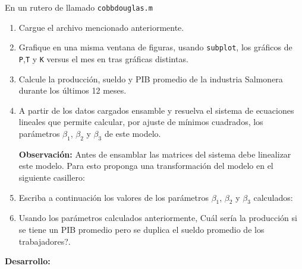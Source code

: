 En un rutero de \matlab llamado \texttt{cobbdouglas.m}
\begin{enumerate}
\item Cargue el archivo mencionado anteriormente.
\item Grafique en una misma ventana de figuras, usando \texttt{subplot}, los gr\'aficos de \texttt{P},\texttt{T} y \texttt{K} versus el mes en tras gr\'aficas distintas.
\item Calcule la producci\'on, sueldo y PIB promedio de la industria Salmonera durante los \'ultimos 12 meses.
\item A partir de los datos cargados ensamble y resuelva el sistema de ecuaciones lineales que permite calcular, por ajuste de m\'inimos cuadrados, los par\'ametros $\beta_1$, $\beta_2$ y $\beta_3$ de este modelo.

\textbf{Observaci\'on:} Antes de ensamblar las matrices del sistema debe linealizar este modelo. Para esto proponga una transformaci\'on del modelo en el siguiente casillero:

\respuesta{5cm}
\item Escriba a continuaci\'on los valores de los par\'ametros $\beta_1$, $\beta_2$ y $\beta_3$ calculados:

\respuesta{1cm}

\item Usando los par\'ametros calculados anteriormente, \textquestiondown Cu\'al ser\'ia la producci\'on si se tiene un PIB promedio pero se duplica el sueldo promedio de los trabajadores?.

\respuesta{1cm}
\end{enumerate}
\textbf{Desarrollo:} 
